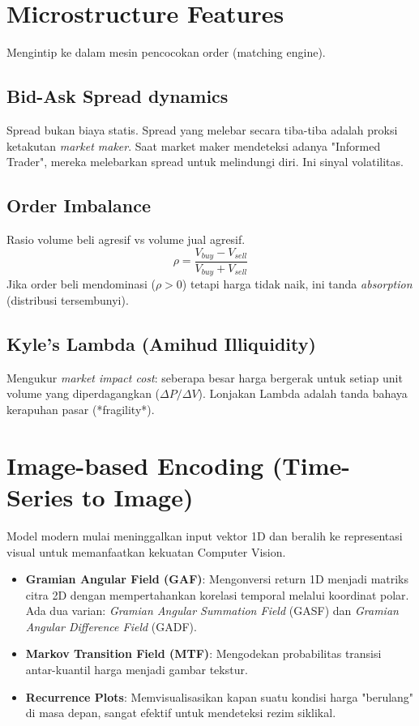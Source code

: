 \documentclass[12pt,a4paper]{book}
\begin{document}
\section{Microstructure Features}
Mengintip ke dalam mesin pencocokan order (matching engine).

\subsection{Bid-Ask Spread dynamics}
Spread bukan biaya statis. Spread yang melebar secara tiba-tiba adalah proksi ketakutan \textit{market maker}. Saat market maker mendeteksi adanya "Informed Trader", mereka melebarkan spread untuk melindungi diri. Ini sinyal volatilitas.

\subsection{Order Imbalance}
Rasio volume beli agresif vs volume jual agresif.
\[ \rho = \frac{V_{buy} - V_{sell}}{V_{buy} + V_{sell}} \]
Jika order beli mendominasi ($\rho > 0$) tetapi harga tidak naik, ini tanda \textit{absorption} (distribusi tersembunyi).

\subsection{Kyle's Lambda (Amihud Illiquidity)}
Mengukur \textit{market impact cost}: seberapa besar harga bergerak untuk setiap unit volume yang diperdagangkan ($ \Delta P / \Delta V $). Lonjakan Lambda adalah tanda bahaya kerapuhan pasar (*fragility*).

\section{Image-based Encoding (Time-Series to Image)}
Model modern mulai meninggalkan input vektor 1D dan beralih ke representasi visual untuk memanfaatkan kekuatan Computer Vision.
\begin{itemize}
    \item \textbf{Gramian Angular Field (GAF)}: Mengonversi return 1D menjadi matriks citra 2D dengan mempertahankan korelasi temporal melalui koordinat polar. Ada dua varian: \textit{Gramian Angular Summation Field} (GASF) dan \textit{Gramian Angular Difference Field} (GADF).
    \item \textbf{Markov Transition Field (MTF)}: Mengodekan probabilitas transisi antar-kuantil harga menjadi gambar tekstur.
    \item \textbf{Recurrence Plots}: Memvisualisasikan kapan suatu kondisi harga "berulang" di masa depan, sangat efektif untuk mendeteksi rezim siklikal.
\end{itemize}
\end{document}
